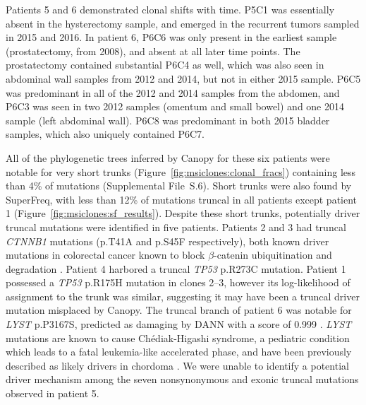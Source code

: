 Patients 5 and 6 demonstrated clonal shifts with time. P5C1 was essentially absent in the hysterectomy sample, and emerged in the recurrent tumors sampled in 2015 and 2016. In patient 6, P6C6 was only present in the earliest sample (prostatectomy, from 2008), and absent at all later time points. The prostatectomy contained substantial P6C4 as well, which was also seen in abdominal wall samples from 2012 and 2014, but not in either 2015 sample. P6C5 was predominant in all of the 2012 and 2014 samples from the abdomen, and P6C3 was seen in two 2012 samples (omentum and small bowel) and one 2014 sample (left abdominal wall). P6C8 was predominant in both 2015 bladder samples, which also uniquely contained P6C7.

All of the phylogenetic trees inferred by Canopy for these six patients were notable for very short trunks (Figure~\ref{fig:msiclones:clonal_fracs}) containing less than 4\% of mutations (Supplemental File~S\thechapter{}.6). Short trunks were also found by SuperFreq, with less than 12\% of mutations truncal in all patients except patient 1 (Figure~\ref{fig:msiclones:sf_results}). Despite these short trunks, potentially driver truncal mutations were identified in five patients. Patients 2 and 3 had truncal \textit{CTNNB1} mutations (p.T41A and p.S45F respectively), both known driver mutations in colorectal cancer \cite{anwar2016,morin1997} known to block $\beta$-catenin ubiquitination and degradation \cite{gao2014}. Patient 4 harbored a truncal \textit{TP53} p.R273C mutation. Patient 1 possessed a \textit{TP53} p.R175H mutation in clones 2--3, however its log-likelihood of assignment to the trunk was similar, suggesting it may have been a truncal driver mutation misplaced by Canopy. The truncal branch of patient 6 was notable for \textit{LYST} p.P3167S, predicted as damaging by DANN with a score of 0.999 \cite{quang2015}. \textit{LYST} mutations are known to cause Ch\'ediak-Higashi syndrome, a pediatric condition which leads to a fatal leukemia-like accelerated phase, and have been previously described as likely drivers in chordoma \cite{tarpey2017}. We were unable to identify a potential driver mechanism among the seven nonsynonymous and exonic truncal mutations observed in patient 5.

